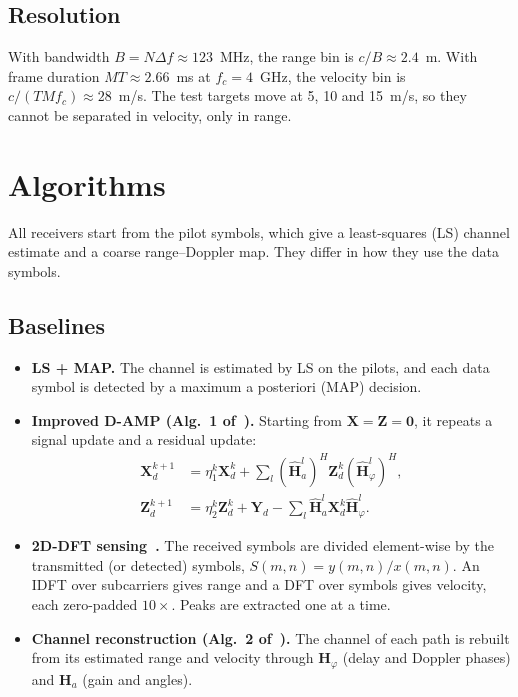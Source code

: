 \documentclass[11pt,a4paper]{article}
\newcommand{\BH}{\mathbf{H}}
\newcommand{\BX}{\mathbf{X}}
\newcommand{\BY}{\mathbf{Y}}
\newcommand{\BZ}{\mathbf{Z}}
\begin{document}
\subsection{Resolution}
With bandwidth $B=N\Delta f\approx 123$~MHz, the range bin is $c/B\approx 2.4$~m. With frame duration $MT\approx 2.66$~ms at $f_c=4$~GHz, the velocity bin is $c/(TMf_c)\approx 28$~m/s. The test targets move at 5, 10 and 15~m/s, so they cannot be separated in velocity, only in range.

\section{Algorithms}\label{sec:algos}
All receivers start from the pilot symbols, which give a least-squares (LS) channel estimate and a coarse range--Doppler map. They differ in how they use the data symbols.

\subsection{Baselines}
\begin{itemize}
  \item \textbf{LS + MAP.} The channel is estimated by LS on the pilots, and each data symbol is detected by a maximum a posteriori (MAP) decision.
  \item \textbf{Improved D-AMP (Alg.~1 of~\cite{isacnet}).} Starting from $\BX=\BZ=\mathbf{0}$, it repeats a signal update and a residual update:
  \begin{align}
    \BX_d^{k+1}&=\eta_1^k\BX_d^k+\sum_l(\hat{\BH}_a^l)^H\BZ_d^k(\hat{\BH}_\varphi^l)^H,\\
    \BZ_d^{k+1}&=\eta_2^k\BZ_d^k+\BY_d-\sum_l\hat{\BH}_a^l\BX_d^k\hat{\BH}_\varphi^l.
  \end{align}
  \item \textbf{2D-DFT sensing~\cite{sturm2011}.} The received symbols are divided element-wise by the transmitted (or detected) symbols, $S(m,n)=y(m,n)/x(m,n)$. An IDFT over subcarriers gives range and a DFT over symbols gives velocity, each zero-padded $10\times$. Peaks are extracted one at a time.
  \item \textbf{Channel reconstruction (Alg.~2 of~\cite{isacnet}).} The channel of each path is rebuilt from its estimated range and velocity through $\BH_\varphi$ (delay and Doppler phases) and $\BH_a$ (gain and angles).
\end{itemize}
\end{document}
